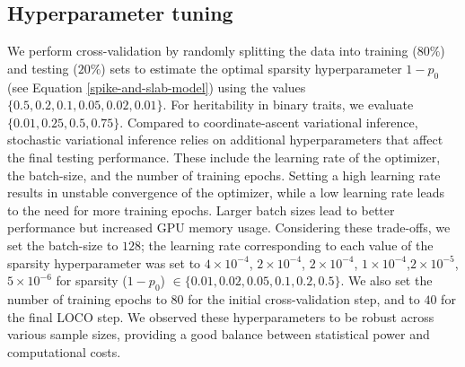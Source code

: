 \subsection{Hyperparameter tuning}
We perform cross-validation by randomly splitting the data into training ($80\%$) and testing ($20\%$) sets to estimate the optimal sparsity hyperparameter $1-p_0$ (see Equation \ref{spike-and-slab-model}) using the values $\{0.5, 0.2, 0.1, 0.05, 0.02, 0.01\}$.
%
For heritability in binary traits, we evaluate $\{0.01, 0.25, 0.5, 0.75 \}$.
%
Compared to coordinate-ascent variational inference, stochastic variational inference relies on additional hyperparameters that affect the final testing performance.
%
These include the learning rate of the optimizer, the batch-size, and the number of training epochs.
%
Setting a high learning rate results in unstable convergence of the optimizer, while a low learning rate leads to the need for more training epochs.
%
Larger batch sizes lead to better performance but increased GPU memory usage.
%
Considering these trade-offs, we set the batch-size to $128$; the learning rate corresponding to each value of the sparsity hyperparameter was set to $4 \times 10^{-4}$, $2 \times 10^{-4}$, $2 \times 10^{-4}$, $1 \times 10^{-4}$,$2 \times 10^{-5}$, $5 \times 10^{-6}$ for sparsity ($1-p_0$) $ \in \{0.01, 0.02, 0.05, 0.1, 0.2, 0.5\}$.
%
We also set the number of training epochs to $80$ for the initial cross-validation step, and to $40$ for the final LOCO step.
%
We observed these hyperparameters to be robust across various sample sizes, providing a good balance between statistical power and computational costs. 


